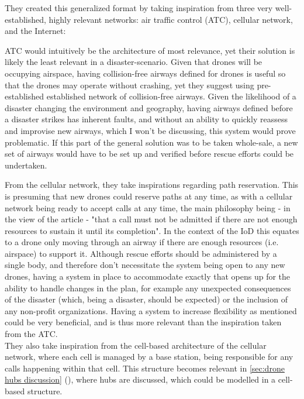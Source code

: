 \documentclass[fleqn,10pt]{wlscirep}
\newcommand{\citesup}[1]{\textsuperscript{\cite{#1}}}
\newcommand{\cnref}[1]{\cref{#1} (\nameref{#1})}
\begin{document}
They created this generalized format by taking inspiration from three very well-established, highly relevant networks: air traffic control (ATC), cellular network, and the Internet:

ATC would intuitively be the architecture of most relevance, yet their solution is likely the least relevant in a disaster-scenario. Given that drones will be occupying airspace, having collision-free airways defined for drones is useful so that the drones may operate without crashing, yet they suggest using pre-established established network of collision-free airways. Given the likelihood of a disaster changing the environment and geography, having airways defined before a disaster strikes has inherent faults, and without an ability to quickly reassess and improvise new airways, which I won't be discussing, this system would prove problematic. If this part of the general solution was to be taken whole-sale, a new set of airways would have to be set up and verified before rescue efforts could be undertaken.

From the cellular network, they take inspirations regarding path reservation. This is presuming that new drones could reserve paths at any time, as with a cellular network being ready to accept calls at any time, the main philosophy being  - in the view of the article - "that a call must not be admitted if there are not enough resources to sustain it until its completion"\citesup{Internet_of_Drones}. In the context of the IoD this equates to a drone only moving through an airway if there are enough resources (i.e. airspace) to support it. Although rescue efforts should be administered by a single body, and therefore don't necessitate the system being open to any new drones, having a system in place to accommodate exactly that opens up for the ability to handle changes in the plan, for example any unexpected consequences of the disaster (which, being a disaster, should be expected) or the inclusion of any non-profit organizations. Having a system to increase flexibility as mentioned could be very beneficial, and is thus more relevant than the inspiration taken from the ATC.\\ They also take inspiration from the cell-based architecture of the cellular network, where each cell is managed by a base station, being responsible for any calls happening within that cell. This structure becomes relevant in \cnref{sec:drone hubs discussion}, where hubs are discussed, which could be modelled in a cell-based structure.
\end{document}
